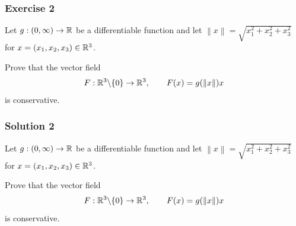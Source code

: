 \documentclass[10pt, t, allowdisplaybreaks]{beamer}
\newcommand{\nullspacesmall}{~\vspace{1em}}
\begin{document}
\begin{frame}
    \frametitle{Exercise 2}
    \par Let $g:(0, \infty)\rightarrow \mathbb{R}$ be a differentiable function and let 
    $\left\lVert x\right\rVert = \sqrt{x^2_1+x^2_2+x^2_3}$ for $x = (x_1, x_2, x_3)\in \mathbb{R}^3$.
    \par Prove that the vector field 
    \begin{equation*}
        F:\mathbb{R}^3\backslash\{0\}\rightarrow \mathbb{R}^3, \qquad F(x) = g(\left\lVert x\right\rVert )x
    \end{equation*}
    is conservative.
\end{frame}

\begin{frame}
    \frametitle{Solution 2}
    \par Let $g:(0, \infty)\rightarrow \mathbb{R}$ be a differentiable function and let 
    $\left\lVert x\right\rVert = \sqrt{x^2_1+x^2_2+x^2_3}$ for $x = (x_1, x_2, x_3)\in \mathbb{R}^3$.
    \par Prove that the vector field 
    \begin{equation*}
        F:\mathbb{R}^3\backslash\{0\}\rightarrow \mathbb{R}^3, \qquad F(x) = g(\left\lVert x\right\rVert )x
    \end{equation*}
    is conservative.
    
    \nullspacesmall
\end{frame}
\end{document}

